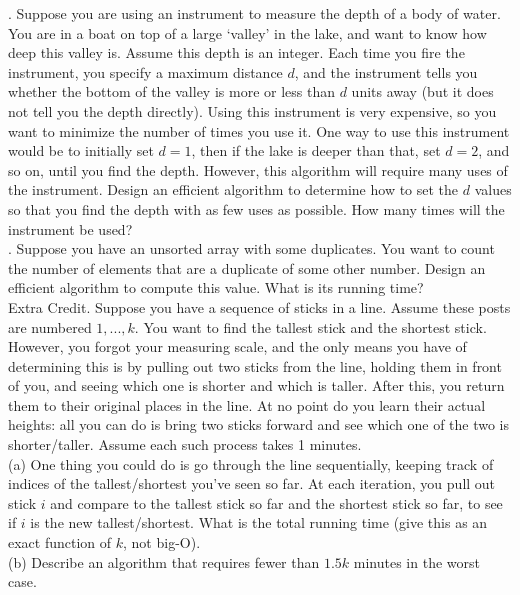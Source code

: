 \documentclass[12pt]{article}
\begin{document}
.  Suppose you are using an instrument to measure the depth of a body of water.  You are in a boat on top of a large `valley' in the lake, and want to know how deep this valley is.  Assume this depth is an integer.  Each time you fire the instrument, you specify a maximum distance $d$, and the instrument tells you whether the bottom of the valley is more or less than $d$ units away (but it does not tell you the depth directly).  Using this instrument is very expensive, so you want to minimize the number of times you use it.  One way to use this instrument would be to initially set $d=1$, then if the lake is deeper than that, set $d = 2$, and so on, until you find the depth.  However, this algorithm will require many uses of the instrument.  Design an efficient algorithm to determine how to set the $d$ values so that you find the depth with as few uses as possible.  How many times will the instrument be used?\\

.  Suppose you have an unsorted array with some duplicates.  You want to count the number of elements that are a duplicate of some other number.  Design an efficient algorithm to compute this value.  What is its running time?\\

\noindent
Extra Credit.  Suppose you have a sequence of sticks in a line.  Assume these posts are numbered $1, ..., k$.  You want to find the tallest stick and the shortest stick.  However, you forgot your measuring scale, and the only means you have of determining this is by pulling out two sticks from the line, holding them in front of you, and seeing which one is shorter and which is taller. After this, you return them to their original places in the line. At no point do you learn their actual heights: all you can do is bring two sticks forward and see which one of the two is shorter/taller.  Assume each such process takes 1 minutes.\\

\noindent
(a) One thing you could do is go through the line sequentially, keeping track of indices of the tallest/shortest you've seen so far.  At each iteration, you pull out stick $i$ and compare to the tallest stick so far and the shortest stick so far, to see if $i$ is the new tallest/shortest.  What is the total running time (give this as an exact function of $k$, not big-O).\\ 

\noindent
(b) Describe an algorithm that requires fewer than $1.5k$ minutes in the worst case.  \\

 
\end{document}
